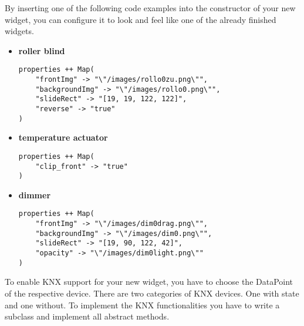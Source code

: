 \begin{itemize}
        By inserting one of the following code examples into the constructor of your new widget, you can configure it to look and feel like one of the already finished widgets.
        \begin{itemize}
            \item \textbf{roller blind}
\begin{lstlisting}[caption=widget configuration roller blind: Rollo.scala,label=lst:h2h:rollerblindconfig]
properties ++ Map(
	"frontImg" -> "\"/images/rollo0zu.png\"",
	"backgroundImg" -> "\"/images/rollo0.png\"",
	"slideRect" -> "[19, 19, 122, 122]",
    "reverse" -> "true"
)
\end{lstlisting}
            \item \textbf{temperature actuator}
            \begin{lstlisting}[caption=widget configuration temperature actuator: Temperature.scala,label=lst:h2h:temperatureconfig]
properties ++ Map(
    "clip_front" -> "true"
)
\end{lstlisting}
            \item \textbf{dimmer}
\begin{lstlisting}[caption=widget configuration dimmer: Dimmer.scala,label=lst:h2h:dimmerconfig]
properties ++ Map(
    "frontImg" -> "\"/images/dim0drag.png\"",
	"backgroundImg" -> "\"/images/dim0.png\"",
	"slideRect" -> "[19, 90, 122, 42]",
	"opacity" -> "\"/images/dim0light.png\""
)
\end{lstlisting}
        \end{itemize}
\end{itemize}

To enable KNX support for your new widget, you have to choose the DataPoint of the respective device. There are two categories of KNX devices. One with state and one without. To implement the KNX functionalities you have to write a subclass and implement all abstract methods.

